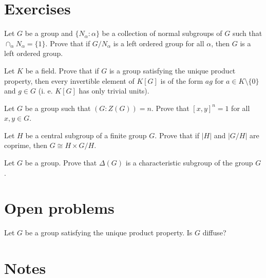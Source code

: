 \section{Exercises}

\begin{prob}
	Let $G$ be a group and $\{N_\alpha:\alpha\}$ be a collection of normal subgroups of $G$ such that
	$\cap_{\alpha}N_\alpha=\{1\}$. Prove that if $G/N_{\alpha}$ is a left ordered group for all $\alpha$, then 
	$G$ is a left ordered group. 
\end{prob}

\begin{prob}
	Let $K$ be a field. Prove that if $G$ is a group satisfying the unique product property, then every invertible element of $K[G]$ is of the form $ag$ for $a\in K\setminus\{ 0\}$ and $g\in G$ (i. e. $K[G]$ has only trivial units).
\end{prob}

\begin{prob}
	\label{xca:[x,y]^n=1}
	Let $G$ be a group such that $(G:Z(G))=n$. Prove that $[x,y]^n=1$ for all $x,y\in G$. 
\end{prob}

\begin{prob}
	Let $H$ be a central subgroup of a finite group $G$. Prove that if $|H|$
	and $|G/H|$ are coprime, then $G\cong H\times G/H$.
\end{prob}

\begin{prob}
Let $G$ be a group.
Prove that $\Delta(G)$ is a characteristic subgroup of the group $G$.
\end{prob}

\section{Open problems}
\begin{problem}
Let $G$ be a group satisfying the unique product property. Is $G$ diffuse?
\end{problem}


\section*{Notes}